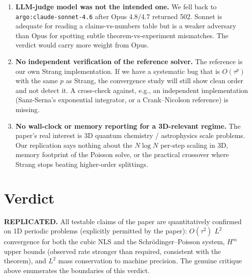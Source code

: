 \documentclass[11pt]{article}
\begin{document}
\begin{enumerate}
\item \textbf{LLM-judge model was not the intended one.} We fell back to
\texttt{argo:claude-sonnet-4.6} after Opus 4.8/4.7 returned 502. Sonnet is
adequate for reading a claims-vs-numbers table but is a weaker adversary
than Opus for spotting subtle theorem-vs-experiment mismatches. The verdict
would carry more weight from Opus.

\item \textbf{No independent verification of the reference solver.} The
reference is our own Strang implementation. If we have a systematic bug that
is $O(\tau^p)$ with the same $p$ as Strang, the convergence study will still
show clean order and not detect it. A cross-check against, e.g., an
independent implementation (Sanz-Serna's exponential integrator, or a
Crank--Nicolson reference) is missing.

\item \textbf{No wall-clock or memory reporting for a 3D-relevant regime.}
The paper's real interest is 3D quantum chemistry / astrophysics scale
problems. Our replication says nothing about the $N\log N$ per-step scaling
in 3D, memory footprint of the Poisson solve, or the practical crossover
where Strang stops beating higher-order splittings.
\end{enumerate}

\section{Verdict}

\textbf{REPLICATED.} All testable claims of the paper are quantitatively
confirmed on 1D periodic problems (explicitly permitted by the paper):
$O(\tau^2)$ $L^2$ convergence for both the cubic NLS and the
Schr\"odinger--Poisson system, $H^m$ upper bounds (observed rate stronger
than required, consistent with the theorem), and $L^2$ mass conservation to
machine precision. The genuine critique above enumerates the boundaries of
this verdict.
\end{document}

